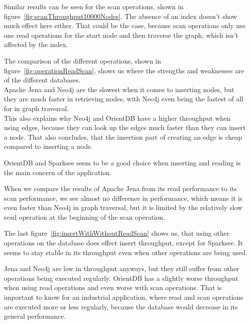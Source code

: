 Similar results can be seen for the scan operations,
shown in figure~\ref{fig:scanThroughput10000Nodes}.
The absence of an index doesn't show much effect here either.
That could be the case,
because scan operations only use one read operations for the start node and then traverse the graph,
which isn't affected by the index.

The comparison of the different operations,
shown in figure~\ref{fig:operationReadScan}, shows us where the strengths and weaknesses are of the different databases.\\
Apache Jena and Neo4j are the slowest when it comes to inserting nodes,
but they are much faster in retrieving nodes,
with Neo4j even being the fastest of all for in graph traversal.\\
This also explains why Neo4j and OrientDB have a higher throughput when using edges,
because they can look up the edges much faster than they can insert a node.
That also concludes,
that the insertion part of creating an edge is cheap compared to inserting a node.

OrientDB and Sparksee seem to be a good choice when inserting and reading is the main concern of the application.

When we compare the results of Apache Jena from its read performance to its scan performance,
we see almost no difference in performance,
which means it is even faster than Neo4j in graph traversal,
but it is limited by the relatively slow read operation at the beginning of the scan operation.

The last figure~\ref{fig:insertWithWithoutReadScan} shows us,
that using other operations on the database does effect insert throughput,
except for Sparksee.
It seems to stay stable in its throughput even when other operations are being used.

Jena and Neo4j are low in throughput anyways,
but they still suffer from other operations being executed regularly.
OrientDB has a slightly worse throughput when using read operations and even worse with scan operations.
That is important to know for an industrial application,
where read and scan operations are executed more or less regularly,
because the database would decrease in its general performance.

